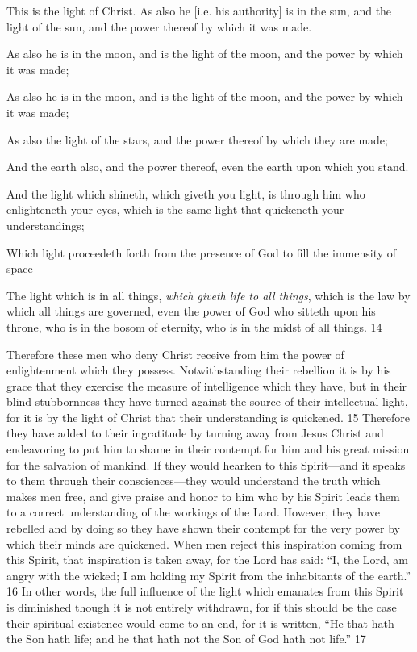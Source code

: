 This is the light of Christ. As also he [i.e. his authority] is in the sun, and the light of the sun,
and the power thereof by which it was made.

As also he is in the moon, and is the light of the moon, and the power by which it was made;

As also he is in the moon, and is the light of the moon, and the power by which it was made;

As also the light of the stars, and the power thereof by which they are made;

And the earth also, and the power thereof, even the earth upon which you stand.

And the light which shineth, which giveth you light, is through him who enlighteneth your
eyes, which is the same light that quickeneth your understandings;

Which light proceedeth forth from the presence of God to fill the immensity of space—

The light which is in all things, \textit{which giveth life to all things}, which is the law by which all
things are governed, even the power of God who sitteth upon his throne, who is in the bosom
of eternity, who is in the midst of all things. 14

Therefore these men who deny Christ receive from him the power of enlightenment which
they possess. Notwithstanding their rebellion it is by his grace that they exercise the measure
of intelligence which they have, but in their blind stubbornness they have turned against the
source of their intellectual light, for it is by the light of Christ that their understanding is
quickened. 15 Therefore they have added to their ingratitude by turning away from Jesus
Christ and endeavoring to put him to shame in their contempt for him and his great mission
for the salvation of mankind. If they would hearken to this Spirit—and it speaks to them
through their consciences—they would understand the truth which makes men free, and give
praise and honor to him who by his Spirit leads them to a correct understanding of the
workings of the Lord. However, they have rebelled and by doing so they have shown their
contempt for the very power by which their minds are quickened. When men reject this
inspiration coming from this Spirit, that inspiration is taken away, for the Lord has said: ``I,
the Lord, am angry with the wicked; I am holding my Spirit from the inhabitants of the
earth.'' 16 In other words, the full influence of the light which emanates from this Spirit is
diminished though it is not entirely withdrawn, for if this should be the case their spiritual
existence would come to an end, for it is written, ``He that hath the Son hath life; and he that
hath not the Son of God hath not life.'' 17


